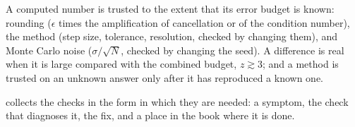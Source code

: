 \begin{keyidea}
A computed number is trusted to the extent that its error budget is known: rounding ($\epsilon$ times the amplification of cancellation or of the condition number), the method (step size, tolerance, resolution, checked by changing them), and Monte Carlo noise ($\sigma/\sqrt N$, checked by changing the seed). A difference is real when it is large compared with the combined budget, $z\gtrsim3$; and a method is trusted on an unknown answer only after it has reproduced a known one.
\end{keyidea}

 collects the checks in the form in which they are needed: a symptom, the check that diagnoses it, the fix, and a place in the book where it is done.

